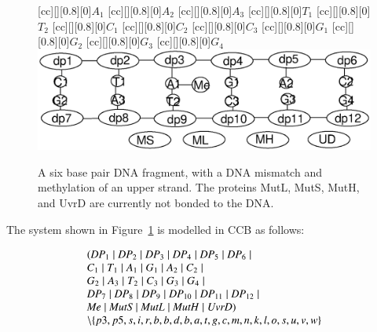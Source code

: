\begin{figure}[h!]
[cc][][0.8][0]{$A_1$}
[cc][][0.8][0]{$A_2$}
[cc][][0.8][0]{$A_3$}
[cc][][0.8][0]{$T_1$}
[cc][][0.8][0]{$T_2$}
[cc][][0.8][0]{$C_1$}
[cc][][0.8][0]{$C_2$}
[cc][][0.8][0]{$C_3$}
[cc][][0.8][0]{$G_1$}
[cc][][0.8][0]{$G_2$}
[cc][][0.8][0]{$G_3$}
[cc][][0.8][0]{$G_4$}
  \centering
    \includegraphics[width=1.0\textwidth]{mmr/state1}
  \caption[A six base pair DNA fragment.]{A six base pair DNA fragment, with a DNA mismatch and methylation of an upper strand. The proteins MutL, MutS, MutH, and UvrD are currently not bonded to the DNA.}
  \label{fig:state1}
\end{figure}

The system shown in Figure~\ref{fig:state1} is modelled in CCB as follows:

$$\begin{array}{l}
(\mathit{DP}_1 \; \vert \; \mathit{DP}_2 \; \vert \; \mathit{DP}_3 \; \vert \; \mathit{DP}_4 \; \vert \; \mathit{DP}_5 \; \vert \; \mathit{DP}_6 \; \vert \; \\
C_1 \; \vert \; T_1 \; \vert \; A_1 \; \vert \; G_1 \; \vert \; A_2 \; \vert \; C_2 \; \vert \; \\
G_2 \; \vert \; A_3 \; \vert \; T_2 \; \vert \; C_3 \; \vert \; G_3 \; \vert \; G_4 \; \vert \; \\
\mathit{DP}_7 \; \vert \; \mathit{DP}_8 \; \vert \; \mathit{DP}_9 \; \vert \; \mathit{DP}_{10} \; \vert \; \mathit{DP}_{11} \; \vert \; \mathit{DP}_{12} \; \vert \; \\
\mathit{Me} \; \vert \; \mathit{MutS} \; \vert \; \mathit{MutL} \; \vert \; \mathit{MutH} \; \vert \; \mathit{UvrD}) \\
\setminus\{p3, p5, s, i, r, b, b, d, b, a, t, g, c, m, n, k, l, o, s, u, v, w\}
\end{array}$$

